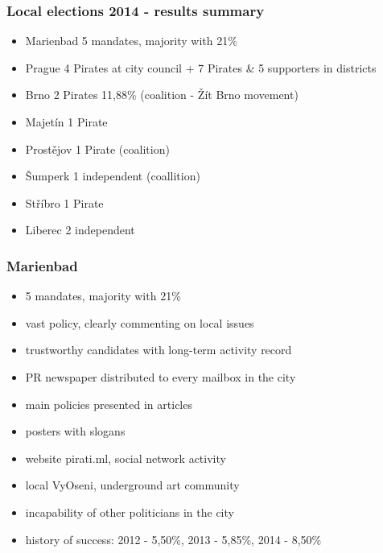 \begin{frame}
	\frametitle{Local elections 2014 - results summary}
	\begin{itemize}
	\item Marienbad 5 mandates, majority with 21\%
	\item Prague 4 Pirates at city council + 7 Pirates \& 5 supporters in districts
	\item Brno 2 Pirates 11,88\% (coalition - \v{Z}\'it Brno movement)
	\item Majet\'in 1 Pirate
	\item Prost\v{e}jov 1 Pirate (coalition)
	\item \v{S}umperk 1 independent (coallition)
	\item St\v{r}\'ibro 1 Pirate
	\item Liberec 2 independent
	\end{itemize}
\end{frame}
\begin{frame}
	\frametitle{Marienbad}
	\begin{itemize}
	\item 5 mandates, majority with 21\%
	\item vast policy, clearly commenting on local issues
	\item trustworthy candidates with long-term activity record
	\item PR newspaper distributed to every mailbox in the city
	\item main policies presented in articles
	\item posters with slogans
	\item website pirati.ml, social network activity
	\item local VyOseni, underground art community
	\item incapability of other politicians in the city
	\item history of success: 2012 - 5,50\%, 2013 - 5,85\%, 2014 - 8,50\%
	\end{itemize}
\end{frame}

